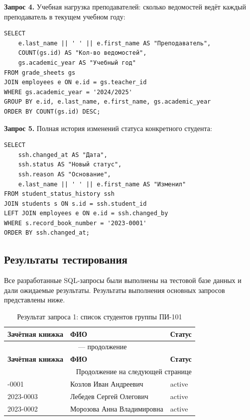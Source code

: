 \documentclass[14pt, a4paper]{extreport}
\begin{document}
\textbf{Запрос 4.} Учебная нагрузка преподавателей: сколько ведомостей ведёт каждый преподаватель в текущем учебном году:
\begin{lstlisting}[caption={Запрос 4: Учебная нагрузка преподавателей}]
SELECT 
    e.last_name || ' ' || e.first_name AS "Преподаватель",
    COUNT(gs.id) AS "Кол-во ведомостей",
    gs.academic_year AS "Учебный год"
FROM grade_sheets gs
JOIN employees e ON e.id = gs.teacher_id
WHERE gs.academic_year = '2024/2025'
GROUP BY e.id, e.last_name, e.first_name, gs.academic_year
ORDER BY COUNT(gs.id) DESC;
\end{lstlisting}

\textbf{Запрос 5.} Полная история изменений статуса конкретного студента:
\begin{lstlisting}[caption={Запрос 5: История изменений статуса}]
SELECT 
    ssh.changed_at AS "Дата",
    ssh.status AS "Новый статус",
    ssh.reason AS "Основание",
    e.last_name || ' ' || e.first_name AS "Изменил"
FROM student_status_history ssh
JOIN students s ON s.id = ssh.student_id
LEFT JOIN employees e ON e.id = ssh.changed_by
WHERE s.record_book_number = '2023-0001'
ORDER BY ssh.changed_at;
\end{lstlisting}

\subsection{Результаты тестирования}
Все разработанные SQL-запросы были выполнены на тестовой базе данных и дали ожидаемые результаты. Результаты выполнения основных запросов представлены ниже.

\begin{longtable}{p{3cm} p{6cm} p{3cm}}
\caption{Результат запроса 1: список студентов группы ПИ-101} \\
\toprule
\textbf{Зачётная книжка} & \textbf{ФИО} & \textbf{Статус} \\
\midrule
\endfirsthead
\multicolumn{3}{c}{{\tablename\ \thetable{} --- продолжение}} \\
\toprule
\textbf{Зачётная книжка} & \textbf{ФИО} & \textbf{Статус} \\
\midrule
\endhead
\midrule
\multicolumn{3}{r}{{Продолжение на следующей странице}} \\
\endfoot
\bottomrule
\endlastfoot
2023-0001 & Козлов Иван Андреевич & active \\
2023-0003 & Лебедев Сергей Олегович & active \\
2023-0002 & Морозова Анна Владимировна & active \\
\end{longtable}
\end{document}

